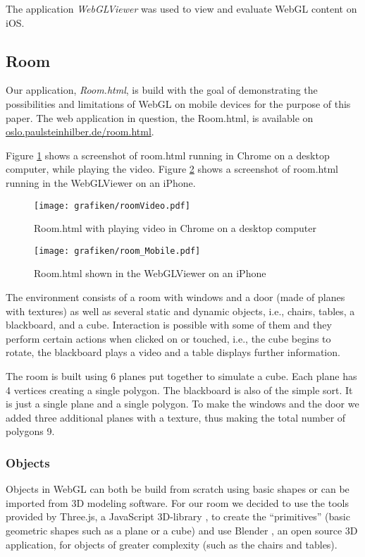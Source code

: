 \documentclass[12pt,journal,compsoc]{IEEEtran}
\begin{document}
The application \textit{WebGLViewer} was used to view and evaluate WebGL content on iOS.

\subsection{Room} \label{roomhtml}
Our application, \textit{Room.html}, is build with the goal of demonstrating the possibilities and limitations of WebGL on mobile devices for the purpose of this paper. The web application in question, the Room.html, is available on \url{oslo.paulsteinhilber.de/room.html}. 

Figure \ref{fig:roomVideo} shows a screenshot of room.html running in Chrome on a desktop computer, while playing the video. Figure \ref{fig:roomMobile} shows a screenshot of room.html running in the WebGLViewer on an iPhone.

\begin{figure}
\centerline{\texttt{[image: grafiken/roomVideo.pdf]}}
	\caption{Room.html with playing video in Chrome on a desktop computer}
	\label{fig:roomVideo}
\end{figure}

\begin{figure}
	\centerline{\texttt{[image: grafiken/room\_Mobile.pdf]}}
	\caption{Room.html shown in the WebGLViewer on an iPhone}
	\label{fig:roomMobile}
\end{figure}

The environment consists of a room with windows and a door (made of planes with textures) as well as several static and dynamic objects, i.e., chairs, tables, a blackboard, and a cube. Interaction is possible with some of them and they perform certain actions when clicked on or touched, i.e., the cube begins to rotate, the blackboard plays a video and a table displays further information.

The room is built using 6 planes put together to simulate a cube. Each plane has 4 vertices creating a single polygon. The blackboard is also of the simple sort. It is just a single plane and a single polygon. To make the windows and the door we added three additional planes with a texture, thus making the total number of polygons 9.

\subsubsection{Objects}
Objects in WebGL can both be build from scratch using basic shapes or can be imported from 3D modeling software. For our room we decided to use the tools provided by Three.js, a JavaScript 3D-library \cite{ThreeJS}, to create the “primitives” (basic geometric shapes such as a plane or a cube) and use Blender \cite{Blender3d}, an open source 3D application, for objects of greater complexity (such as the chairs and tables).
\end{document}
